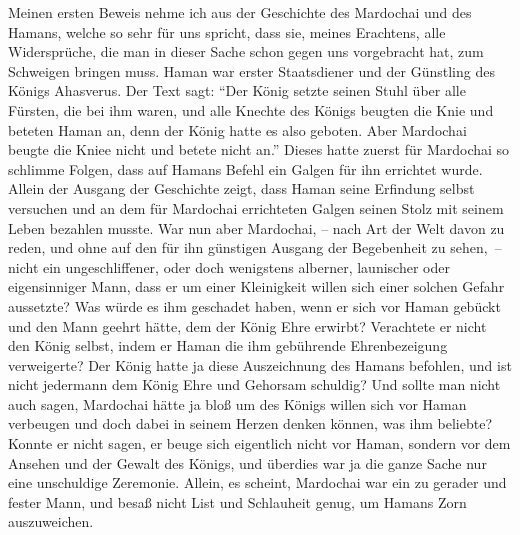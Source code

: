 Meinen ersten Beweis nehme ich aus der Geschichte des
Mardochai und des Hamans,
welche so sehr für uns spricht, dass sie, meines Erachtens, alle Widersprüche,
die man in dieser Sache schon gegen uns vorgebracht hat, zum Schweigen bringen
muss. Haman war erster Staatsdiener und der Günstling des Königs Ahasverus. Der
Text sagt:
"`Der König setzte seinen Stuhl über alle Fürsten, die bei ihm waren,
und alle Knechte des Königs beugten die Knie und beteten Haman an, denn der
König hatte es also geboten. Aber Mardochai beugte die Kniee nicht und betete
nicht an."'
Dieses hatte zuerst für Mardochai so
schlimme Folgen, dass auf Hamans Befehl ein Galgen für ihn errichtet wurde.
Allein
der Ausgang der Geschichte zeigt, dass Haman seine Erfindung selbst versuchen
und an dem für Mardochai errichteten Galgen seinen Stolz mit seinem Leben
bezahlen musste. War nun aber Mardochai, -- nach Art der Welt davon zu reden,
und
ohne auf den für ihn günstigen Ausgang der Begebenheit zu sehen,~-- nicht ein
ungeschliffener, oder doch wenigstens alberner, launischer oder eigensinniger
Mann, dass er um einer Kleinigkeit willen sich einer solchen Gefahr aussetzte?
Was würde es ihm geschadet haben, wenn er sich vor
Haman gebückt und den Mann geehrt hätte, dem der König Ehre erwirbt? Verachtete
er nicht den König selbst, indem er Haman die ihm gebührende Ehrenbezeigung
verweigerte? Der König hatte ja diese Auszeichnung des Hamans befohlen, und ist
nicht jedermann dem König Ehre und Gehorsam schuldig? Und sollte man nicht auch
sagen, Mardochai hätte ja bloß um des Königs willen sich vor Haman verbeugen und
doch dabei in seinem Herzen denken können, was ihm beliebte? Konnte er nicht
sagen, er beuge sich eigentlich nicht vor Haman, sondern vor dem Ansehen und der
Gewalt des Königs, und überdies war ja die ganze Sache nur eine unschuldige
Zeremonie. Allein, es scheint, Mardochai war ein zu gerader und fester Mann, und
besaß nicht List und Schlauheit genug, um Hamans Zorn auszuweichen.

